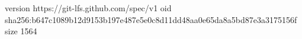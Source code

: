 version https://git-lfs.github.com/spec/v1
oid sha256:b647c1089b12d9153b197e487e5e0c8d11dd48aa0e65da8a5bd87e3a3175156f
size 1564
